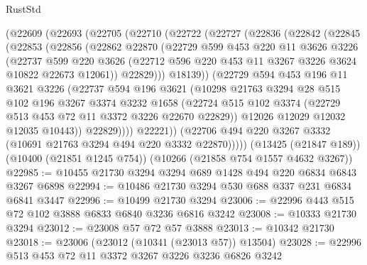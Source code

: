 \begin{lexlean}{RustStd}
\begin{coremodule}
{\begin{coremodule}
{{{{{{{{{{{{{{{{{{{{{{{{{    (@22609
      (@22693
        (@22705
          (@22710
            (@22722
              (@22727
                (@22836
                  (@22842
                    (@22845
                      (@22853
                        (@22856
                          (@22862
                            @22870
                            (@22729
                              @599
                              @453
                              @220
                              @11
                              @3626
                              @3226
                              (@22737
                                @599
                                @220
                                @3626
                                (@22712 @596 @220 @453 @11 @3267 @3226 @3624 @10822 @22673 @12061))
                              @22829)))
                        @18139))
                    (@22729
                      @594
                      @453
                      @196
                      @11
                      @3621
                      @3226
                      (@22737
                        @594
                        @196
                        @3621
                        (@10298
                          @21763
                          @3294
                          @28
                          @515
                          @102
                          @196
                          @3267
                          @3374
                          @3232
                          @1658
                          (@22724
                            @515
                            @102
                            @3374
                            (@22729 @513 @453 @72 @11 @3372 @3226 @22670 @22829))
                          @12026
                          @12029
                          @12032
                          @12035
                          @10443))
                      @22829))))
              @22221))
          (@22706 @494 @220 @3267 @3332 (@10691 @21763 @3294 @494 @220 @3332 @22870)))))
    (@13425 (@21847 @189))
    (@10400 (@21851 @1245 @754))
    (@10266 (@21858 @754 @1557 @4632 @3267))
@22985 := @10455 @21730 @3294 @3294 @689 @1428 @494 @220 @6834 @6843 @3267 @6898
@22994 := @10486 @21730 @3294 @530 @688 @337 @231 @6834 @6841 @3447
@22996 := @10499 @21730 @3294
@23006 := @22996 @443 @515 @72 @102 @3888 @6833 @6840 @3236 @6816 @3242
@23008 := @10333 @21730 @3294
@23012 := @23008 @57 @72 @57 @3888
@23013 := @10342 @21730
@23018 := @23006 (@23012 (@10341 (@23013 @57)) @13504)
@23028 := @22996 @513 @453 @72 @11 @3372 @3267 @3226 @3236 @6826 @3242
}}}}}}}}}}}}}}}}}}}}}}}}}
\end{coremodule}}
\end{coremodule}
\end{lexlean}
